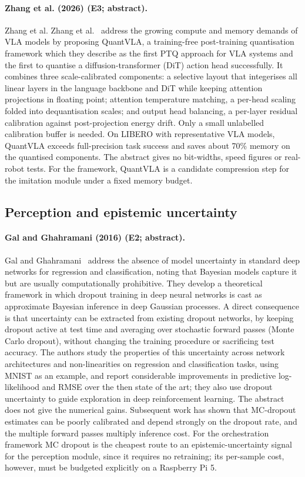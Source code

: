 \documentclass[10pt,a4paper]{article}
\begin{document}
\paragraph{Zhang et al. (2026) (E3; abstract).} Zhang et al. Zhang et al.~\cite{Zhang2026a} address the growing compute and memory demands of VLA models by proposing QuantVLA, a training-free post-training quantisation framework which they describe as the first PTQ approach for VLA systems and the first to quantise a diffusion-transformer (DiT) action head successfully. It combines three scale-calibrated components: a selective layout that integerises all linear layers in the language backbone and DiT while keeping attention projections in floating point; attention temperature matching, a per-head scaling folded into dequantisation scales; and output head balancing, a per-layer residual calibration against post-projection energy drift. Only a small unlabelled calibration buffer is needed. On LIBERO with representative VLA models, QuantVLA exceeds full-precision task success and saves about 70\% memory on the quantised components. The abstract gives no bit-widths, speed figures or real-robot tests. For the framework, QuantVLA is a candidate compression step for the imitation module under a fixed memory budget.

\subsection*{Perception and epistemic uncertainty}
\paragraph{Gal and Ghahramani (2016) (E2; abstract).} Gal and Ghahramani~\cite{Gal2016} address the absence of model uncertainty in standard deep networks for regression and classification, noting that Bayesian models capture it but are usually computationally prohibitive. They develop a theoretical framework in which dropout training in deep neural networks is cast as approximate Bayesian inference in deep Gaussian processes. A direct consequence is that uncertainty can be extracted from existing dropout networks, by keeping dropout active at test time and averaging over stochastic forward passes (Monte Carlo dropout), without changing the training procedure or sacrificing test accuracy. The authors study the properties of this uncertainty across network architectures and non-linearities on regression and classification tasks, using MNIST as an example, and report considerable improvements in predictive log-likelihood and RMSE over the then state of the art; they also use dropout uncertainty to guide exploration in deep reinforcement learning. The abstract does not give the numerical gains. Subsequent work has shown that MC-dropout estimates can be poorly calibrated and depend strongly on the dropout rate, and the multiple forward passes multiply inference cost. For the orchestration framework MC dropout is the cheapest route to an epistemic-uncertainty signal for the perception module, since it requires no retraining; its per-sample cost, however, must be budgeted explicitly on a Raspberry Pi 5.
\end{document}
